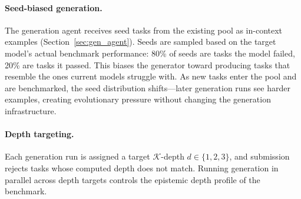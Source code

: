 \documentclass{article} %
\newcommand{\K}{\mathcal{K}}
\newcommand{\agents}{\mathcal{A}}
\newcommand{\mechanics}{\mathcal{M}}
\newcommand{\task}{\mathcal{T}}
\newcommand{\goal}{\varphi}
\newcommand{\taskdesc}{\delta}
\newcommand{\pddl}{\textsc{pddl}}
\newcommand{\saaket}[1]{\textcolor{blue}{[Saaket: #1]}}
\newcommand{\shortname}{\texttt{EmToM}}
\begin{document}
\paragraph{Seed-biased generation.} The generation agent receives seed tasks from the existing pool as in-context examples (Section~\ref{sec:gen_agent}). Seeds are sampled based on the target model's actual benchmark performance: 80\% of seeds are tasks the model failed, 20\% are tasks it passed. This biases the generator toward producing tasks that resemble the ones current models struggle with. As new tasks enter the pool and are benchmarked, the seed distribution shifts---later generation runs see harder examples, creating evolutionary pressure without changing the generation infrastructure.

\paragraph{Depth targeting.} Each generation run is assigned a target $\K$-depth $d \in \{1, 2, 3\}$, and submission rejects tasks whose computed depth does not match. Running generation in parallel across depth targets controls the epistemic depth profile of the benchmark.







\end{document}
